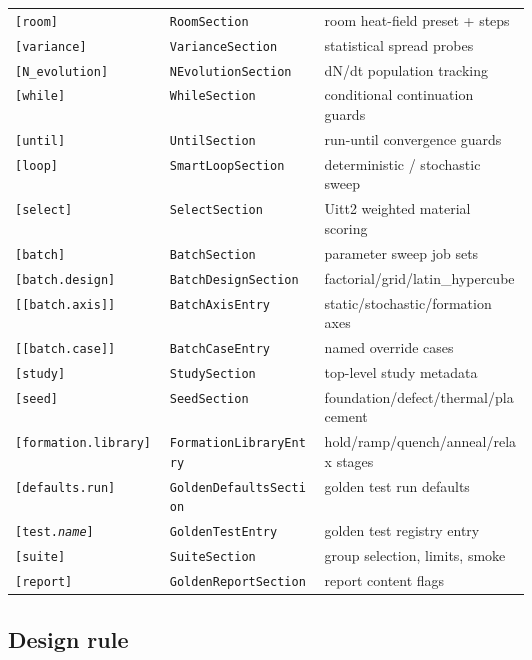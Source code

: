 ﻿\documentclass[11pt,a4paper]{article}
\begin{document}
\begin{center}
\begin{tabularx}{\linewidth}{@{}p{0.30\linewidth}p{0.30\linewidth}X@{}}
\texttt{[room]}              & \texttt{RoomSection}          & room heat-field preset + steps \\
\texttt{[variance]}          & \texttt{VarianceSection}      & statistical spread probes \\
\texttt{[N\_evolution]}      & \texttt{NEvolutionSection}    & dN/dt population tracking \\
\texttt{[while]}             & \texttt{WhileSection}         & conditional continuation guards \\
\texttt{[until]}             & \texttt{UntilSection}         & run-until convergence guards \\
\texttt{[loop]}              & \texttt{SmartLoopSection}     & deterministic / stochastic sweep \\
\texttt{[select]}            & \texttt{SelectSection}        & Uitt2 weighted material scoring \\
\texttt{[batch]}             & \texttt{BatchSection}         & parameter sweep job sets \\
\texttt{[batch.design]}      & \texttt{BatchDesignSection}   & factorial/grid/latin\_hypercube \\
\texttt{[[batch.axis]]}      & \texttt{BatchAxisEntry}       & static/stochastic/formation axes \\
\texttt{[[batch.case]]}      & \texttt{BatchCaseEntry}       & named override cases \\
\texttt{[study]}             & \texttt{StudySection}         & top-level study metadata \\
\texttt{[seed]}              & \texttt{SeedSection}          & foundation/defect/thermal/placement \\
\texttt{[formation.library]} & \texttt{FormationLibraryEntry}& hold/ramp/quench/anneal/relax stages \\
\texttt{[defaults.run]}      & \texttt{GoldenDefaultsSection}& golden test run defaults \\
\texttt{[test.\textit{name}]}& \texttt{GoldenTestEntry}      & golden test registry entry \\
\texttt{[suite]}             & \texttt{SuiteSection}         & group selection, limits, smoke \\
\texttt{[report]}            & \texttt{GoldenReportSection}  & report content flags \\
\bottomrule
\end{tabularx}
\end{center}

\subsection*{Design rule}
\end{document}
